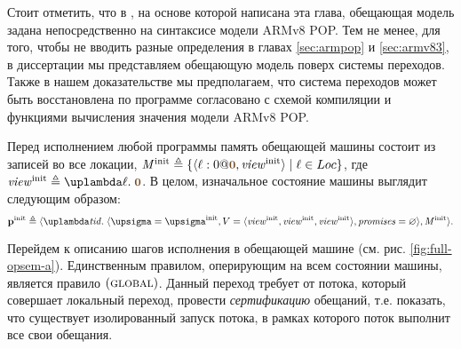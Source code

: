 Стоит отметить, что в \cite{Podkopaev-al:ECOOP17}, на основе которой написана эта глава,
обещающая модель задана непосредственно на синтаксисе модели ARMv8 POP.
Тем не менее, для того, чтобы не вводить разные определения в главах \ref{sec:armpop} и
\ref{sec:armv83}, в диссертации мы представляем обещающую модель поверх системы переходов.
Также в нашем доказательстве мы предполагаем, что система переходов может быть восстановлена
по программе согласовано с схемой компиляции и функциями вычисления значения модели ARMv8 POP.

Перед исполнением любой программы память обещающей машины состоит из записей во все локации,
$\Mprom^{\rm init} \triangleq \{ \writeEvt{\loc}{0}{\tstamp{0}}{\R^{\rm init}} \mid \loc \in \Loc \}$,
где $\R^{\rm init} \triangleq \lambda \loc. \; \tstamp{0}$. В целом, изначальное состояние машины выглядит следующим образом:
\[
  \pinit \triangleq \angled{
     \lambda \tId. \; \angled{\pstate = \pstate^{\rm init},
                              \V = \angled{\R^{\rm init}, \R^{\rm init}, \R^{\rm init}}, \PromSet = \emptyset},
     \Mprom^{\rm init}}.
\]

Перейдем к описанию шагов исполнения в обещающей машине (см. рис. \ref{fig:full-opsem-a}).
Единственным правилом, оперирующим на всем состоянии машины, является правило $(\textsc{global})$.
Данный переход требует от потока,
который совершает локальный переход, провести \emph{сертификацию} обещаний, т.е. показать,
что существует изолированный запуск потока, в рамках которого поток выполнит все свои обещания.


